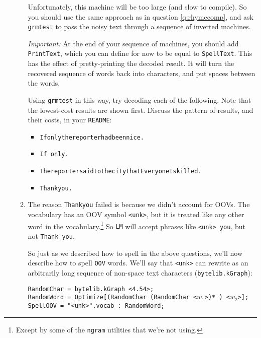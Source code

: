 \documentclass[11pt]{article}
\newcommand{\handinsym}{\color{blue}{\HandLeftUp}}
\newcounter{handin}
\newcommand{\handin}{\stepcounter{handin}\hspace{0pt}\marginpar{\hfill\handinsym$_{\arabic{handin}}$}}
\begin{document}
\begin{enumerate}[resume]
\begin{enumerate}[resume]
    Unfortunately, this machine will be too large (and slow to
    compile). So you should use the same approach as in question
    \ref{q:rhymecomp}, and ask {\tt grmtest} to pass the noisy
    text through a sequence of inverted machines.

    {\em Important:} At the end of your sequence of machines, you
    should add {\tt PrintText}, which you can define for now to be
    equal to {\tt SpellText}.  This has the effect of pretty-printing
    the decoded result.  It will turn the recovered sequence of words
    back into characters, and put spaces between the words.

    Using {\tt grmtest} in this way, try decoding each of the
    following.  Note that the lowest-cost results are shown first.
    \handin Discuss the pattern of results, and their costs, in your
    \verb/README/:
    \begin{itemize}
    \item {\tt Ifonlythereporterhadbeennice.}

    \item {\tt If only.}

    \item \texttt{ThereportersaidtothecitythatEveryoneIskilled.}

    \item {\tt Thankyou.}

    \end{itemize}

  \item The reason \texttt{Thankyou} failed is
    because we didn't account for OOVs.  The vocabulary has an OOV
    symbol \verb/<unk>/, but it is treated like any other word in the
    vocabulary.\footnote{Except by some of the {\tt ngram} utilities
      that we're not using.}
    So {\tt LM} will accept phrases like \texttt{<unk> you}, but not
    {\tt Thank you}.

    So just as we described how to spell in the above questions, we'll
    now describe how to spell \texttt{OOV} words. We'll say that
    \texttt{<unk>} can rewrite as an arbitrarily long sequence of
    non-space text characters (\texttt{bytelib.kGraph}):

    \medskip
    \texttt{RandomChar = bytelib.kGraph <4.54>;} \\
    \texttt{RandomWord = Optimize[(RandomChar (RandomChar <$w_1$>)* ) <$w_2$>];} \\
    \texttt{SpellOOV = "<unk>".vocab : RandomWord;}
    \medskip


\end{enumerate}
\end{enumerate}
\end{document}
